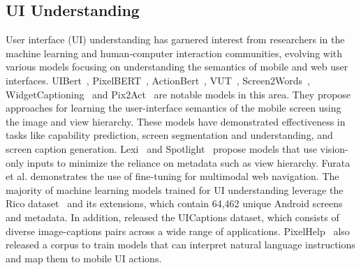 \subsection{UI Understanding}

User interface (UI) understanding has garnered interest from researchers in the machine learning and human-computer interaction communities, evolving with various models focusing on understanding the semantics of mobile and web user interfaces. UIBert~\cite{bai2021uibert}, PixelBERT~\cite{huang2020pixelbert}, ActionBert~\cite{he2021actionbert}, VUT~\cite{li2021vut}, Screen2Words~\cite{wang2021screen2words}, WidgetCaptioning~\cite{li2020widget} and Pix2Act~\cite{shaw2023pixels} are  notable models in this area. They propose approaches for learning the user-interface semantics of the mobile screen using the image and view hierarchy. These models have demonstrated effectiveness in tasks like capability prediction, screen segmentation and understanding, and screen caption generation. Lexi~\cite{banerjee2023lexi} and Spotlight~\cite{li2023spotlight} propose models that use vision-only inputs to minimize the reliance on metadata such as view hierarchy. Furata et al. \cite{furuta2023multimodal} demonstrates the use of fine-tuning for multimodal web navigation. The majority of machine learning models trained for UI understanding leverage the Rico dataset~\cite{rico} and its extensions, which contain 64,462 unique Android screens and metadata. In addition, \cite{banerjee2023lexi} released the UICaptions dataset, which consists of diverse image-captions pairs across a wide range of applications. PixelHelp~\cite{li2020mapping} also released a corpus to train models that can interpret natural language instructions and map them to mobile UI actions.

